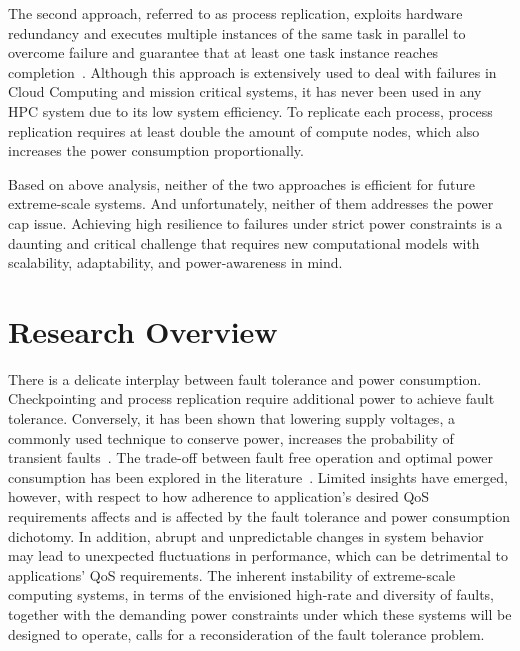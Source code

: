 The second approach, referred to as process replication, exploits hardware redundancy and executes multiple instances of the same task 
in parallel to overcome failure and guarantee that at least one task instance reaches completion~\cite{bartlett_1981_nonstop,tsai_isads_2011,ferreira_sc_2011}. Although this approach is extensively used 
to deal with failures in 
Cloud Computing and mission critical systems, it has 
never been used in any HPC system due to its low system efficiency. To replicate each process, process replication requires 
at least double the amount of compute nodes, which also increases the power consumption proportionally. 

Based on above analysis, neither of the two approaches is efficient for future extreme-scale systems. And unfortunately, neither 
of them addresses the power cap issue. 
Achieving high resilience to failures under strict power constraints is a daunting and critical challenge that requires new 
computational models with scalability, adaptability, and power-awareness in mind. 
 
\section{Research Overview}

There is a delicate interplay between fault tolerance and power consumption. Checkpointing and process replication require 
additional power to achieve fault tolerance. Conversely, it has been shown that lowering supply voltages, a commonly used 
technique to conserve power, increases the probability of transient faults~\cite{chandra2008defect,zhao2008reliability}. The trade-off between fault free operation and 
optimal power consumption has been explored in the literature~\cite{meneses2014energy,mills2014energy}. Limited insights have emerged, however, with respect to how 
adherence to application's desired QoS requirements affects and is affected by the fault tolerance and power consumption 
dichotomy. In addition, abrupt and unpredictable changes in system behavior may lead to unexpected fluctuations in performance, 
which can be detrimental to applications’ QoS requirements. The inherent instability of extreme-scale computing systems, 
in terms of the envisioned high-rate and diversity of faults, together with the demanding power constraints under which 
these systems will be designed to operate, calls for a 
reconsideration of the fault tolerance problem.

